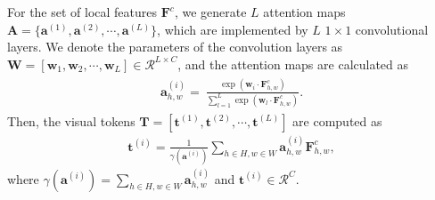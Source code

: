 \documentclass[letterpaper]{article} \usepackage{aaai22}  \usepackage{times}  \usepackage{helvet}  \usepackage{courier}  \usepackage[hyphens]{url}  \usepackage{graphicx} \urlstyle{rm} \def\UrlFont{\rm}  \usepackage{natbib}  \usepackage{caption} \DeclareCaptionStyle{ruled}{labelfont=normalfont,labelsep=colon,strut=off} \frenchspacing  \setlength{\pdfpagewidth}{8.5in}  \setlength{\pdfpageheight}{11in}  \usepackage{algorithm}
\begin{document}
For the set of local features $\bm{F}^c$, we generate $L$ attention maps $\bm{A}=\{\bm{a}^{(1)},\bm{a}^{(2)},\cdots,\bm{a}^{(L)}\}$, which are implemented by $L$ $1 \times 1$ convolutional layers. We denote the parameters of the convolution layers as $\mathbf{W} = \left[\mathbf{w}_1,\mathbf{w}_2,\cdots,\mathbf{w}_L\right] \in \mathcal{R}^{L\times C}$, and the attention maps are calculated as
\begin{eqnarray}\label{eq:atten}
	\begin{aligned}
		\bm{a}^{(i)}_{h,w} = \ \frac{\exp(\mathbf{w}_{i} \cdot \bm{F}^c_{h,w})}{\sum_{l=1}^{L}\exp(\mathbf{w}_{l} \cdot \bm{F}^c_{h,w})}.
	\end{aligned}
\end{eqnarray}
Then, the visual tokens $\bm{T} = \left[\bm{t}^{(1)},\bm{t}^{(2)},\cdots,\bm{t}^{(L)} \right]$ are computed as
\begin{eqnarray}\label{eq:token}
	\bm{t}^{(i)} = \frac{1}{\gamma(\bm{a}^{(i)})} \sum_{h \in H,w \in W} \bm{a}^{(i)}_{h,w}\bm{F}^c_{h,w},
\end{eqnarray}
where $\gamma(\bm{a}^{(i)}) = \sum_{h \in H,w \in W} \bm{a}^{(i)}_{h,w}$ and $\bm{t}^{(i)} \in \mathcal{R}^C$. 
 
\end{document}
